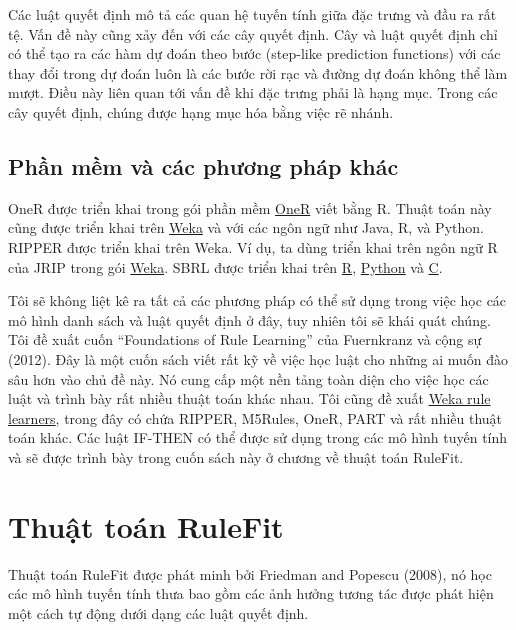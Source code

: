 Các luật quyết định mô tả các quan hệ tuyến tính giữa đặc trưng và đầu ra rất tệ. Vấn đề này cũng xảy đến với các cây quyết định. Cây và luật quyết định chỉ có thể tạo ra các hàm dự đoán theo bước (step-like prediction functions) với các thay đổi trong dự đoán luôn là các bước rời rạc và đường dự đoán không thể làm mượt. Điều này liên quan tới vấn đề khi đặc trưng phải là hạng mục. Trong các cây quyết định, chúng được hạng mục hóa bằng việc rẽ nhánh.

\subsection{Phần mềm và các phương pháp khác}
OneR được triển khai trong gói phần mềm \href{https://cran.r-project.org/web/packages/OneR/}{OneR} viết bằng R. Thuật toán này cũng được triển khai trên \href{https://www.eecs.yorku.ca/tdb/_doc.php/userg/sw/weka/doc/weka/classifiers/rules/package-summary.html}{Weka} và với các ngôn ngữ như Java, R, và Python. RIPPER được triển khai trên Weka. Ví dụ, ta dùng triển khai trên ngôn ngữ R của JRIP trong gói \href{https://cran.r-project.org/web/packages/RWeka/index.html}{Weka}. SBRL được triển khai trên \href{https://cran.r-project.org/web/packages/sbrl/index.html}{R}, \href{https://github.com/datascienceinc/Skater}{Python} và \href{https://github.com/Hongyuy/sbrlmod}{C}.

Tôi sẽ không liệt kê ra tất cả các phương pháp có thể sử dụng trong việc học các mô hình danh sách và luật quyết định ở đây, tuy nhiên tôi sẽ khái quát chúng. Tôi đề xuất cuốn ``Foundations of Rule Learning'' của Fuernkranz và cộng sự (2012). Đây là một cuốn sách viết rất kỹ về việc học luật cho những ai muốn đào sâu hơn vào chủ đề này. Nó cung cấp một nền tảng toàn diện cho việc học các luật và trình bày rất nhiều thuật toán khác nhau. Tôi cũng đề xuất \href{http://weka.sourceforge.net/doc.dev/weka/classifiers/rules/package-summary.html}{Weka rule learners}, trong đây có chứa RIPPER, M5Rules, OneR, PART và rất nhiều thuật toán khác. Các luật IF-THEN có thể được sử dụng trong các mô hình tuyến tính và sẽ được trình bày trong cuốn sách này ở chương về thuật toán RuleFit.

\section{Thuật toán RuleFit}
\label{RuleFit}
Thuật toán RuleFit được phát minh bởi Friedman and Popescu (2008), nó học các mô hình tuyến tính thưa bao gồm các ảnh hưởng tương tác được phát hiện một cách tự động dưới dạng các luật quyết định.

